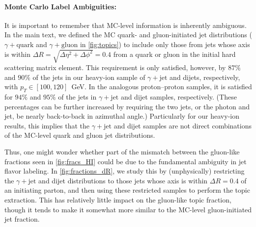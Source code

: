 \documentclass[aps,prl,twocolumn,preprintnumbers,showpacs,floatfix,nofootinbib]{revtex4-1}
\begin{document}
\paragraph{Monte Carlo Label Ambiguities:}
%
It is important to remember that MC-level information is inherently ambiguous.
%
In the main text, we defined the MC quark- and gluon-initiated jet distributions ($\gamma+\text{quark}$ and $\gamma+\text{gluon}$ in \cref{fig:topics}) to include only those from jets whose axis is within $\Delta R = \sqrt{\Delta \eta^2 + \Delta \phi^2} = 0.4$ from a quark or gluon in the initial hard scattering matrix element.
%
This requirement is only satisfied, however, by $87\%$ and $90\%$ of the jets in our heavy-ion sample of $\gamma+\text{jet}$ and dijets, respectively, with $p_T \in [100,120]$~GeV.
%
In the analogous proton--proton samples, it is satisfied for $94\%$ and $95\%$ of the jets in $\gamma+\text{jet}$ and dijet samples, respectively.
%
(These percentages can be further increased by requiring the two jets, or the photon and jet, be nearly back-to-back in azimuthal angle.)
%
Particularly for our heavy-ion results, this implies that the $\gamma+\text{jet}$ and dijet samples are not direct combinations of the MC-level quark and gluon jet distributions.



Thus, one might wonder whether part of the mismatch between the gluon-like fractions seen in \cref{fig:fracs_HI} could be due to the fundamental ambiguity in jet flavor labeling.
%
In \cref{fig:fractions_dR}, we study this by (unphysically) restricting the $\gamma+\text{jet}$ and dijet distributions to those jets whose axis is within $\Delta R=0.4$ of an initiating parton, and then using these restricted samples to perform the topic extraction.
%
This has relatively little impact on the gluon-like topic fraction, though it tends to make it somewhat more similar to the MC-level gluon-initiated jet fraction.
%


\end{document}

